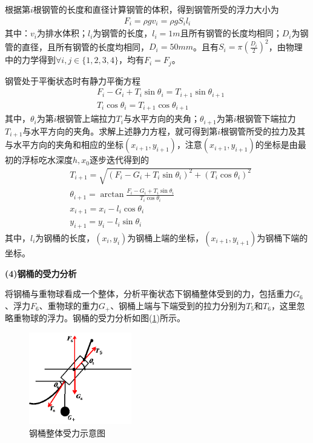             \par
            根据第$i$根钢管的长度和直径计算钢管的体积，得到钢管所受的浮力大小为
            \begin{align*}
            F_i = \rho g v_i = \rho g S_i l_i
            \end{align*}
            其中：$v_i$为排水体积；$l_i$为钢管的长度，$l_i = 1m$且所有钢管的长度均相同；$D_i$为钢管的直径，且所有钢管的长度均相同，$D_i = 50mm $。且有$S_i = \pi \left( \frac{D_i}{2} \right)^2 $，由物理中的力学得到$\forall i,j\in \{1,2,3,4\}$，均有$F_i = F_j$。
            \par
            钢管处于平衡状态时有静力平衡方程
            \begin{align*}
            & F_i - G_i + T_i\sin \theta_i = T_{i+1}\sin \theta_{i+1}\\
            & T_{i}\cos \theta_i = T_{i+1}\cos \theta_{i+1}
            \end{align*}
            其中，$\theta_i$为第$i$根钢管上端拉力$T_i$与水平方向的夹角；$\theta_{i+1}$为第$i$根钢管下端拉力$T_{i+1}$与水平方向的夹角。求解上述静力方程，就可得到第$i$根钢管所受的拉力及其与水平方向的夹角和相应的坐标$(x_{i+1},y_{i+1})$，注意$(x_{i+1},y_{i+1})$的坐标是由最初的浮标吃水深度$h,x_0$逐步迭代得到的
            \begin{align*}
            & T_{i+1} = \sqrt{(F_{i}-G_i + T_i\sin \theta_i)^2+(T_i\cos \theta_i)^2}\\
            & \theta_{i+1} = \arctan\frac{F_i - G_i + T_i \sin \theta_i}{T_i\cos \theta_i}\\
            & x_{i+1} = x_i - l_i\cos\theta_i\\
            & y_{i+1} = y_i - l_i\sin \theta_i
            \end{align*}
            其中，$l_i$为钢桶的长度，$(x_i,y_i)$为钢桶上端的坐标，$(x_{i+1},y_{i+1})$为钢桶下端的坐标。
            \par
            \textbf{(4)钢桶的受力分析}
            \par
            将钢桶与重物球看成一个整体，分析平衡状态下钢桶整体受到的力，包括重力$G_6$、浮力$F_6$、重物球的重力$G_+$、钢桶上端与下端受到的拉力分别为$T_5$和$T_6$，这里忽略重物球的浮力。钢桶的受力分析如图(\ref{fig:钢桶整体受力示意图})所示。
            \begin{figure}[H]
            \centering
            \includegraphics[height=4cm]{images/steel_drums_force_analysis.jpg}
            \caption{钢桶整体受力示意图}
            \label{fig:钢桶整体受力示意图}
            \end{figure}
